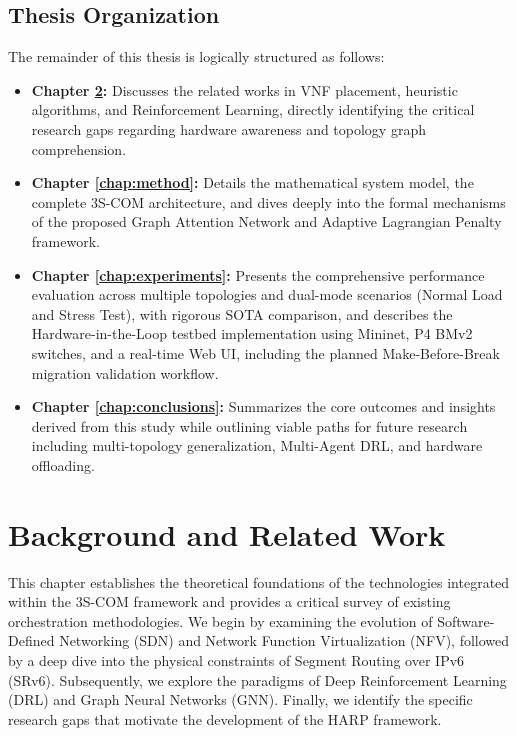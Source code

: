 \documentclass[12pt, a4paper, reqno, oneside]{book}
\begin{document}
\section{Thesis Organization}
The remainder of this thesis is logically structured as follows:
\begin{itemize}
    \item \textbf{Chapter \ref{chap:background_related}:} Discusses the related works in VNF placement, heuristic algorithms, and Reinforcement Learning, directly identifying the critical research gaps regarding hardware awareness and topology graph comprehension.
    \item \textbf{Chapter \ref{chap:method}:} Details the mathematical system model, the complete 3S-COM architecture, and dives deeply into the formal mechanisms of the proposed Graph Attention Network and Adaptive Lagrangian Penalty framework.
    \item \textbf{Chapter \ref{chap:experiments}:} Presents the comprehensive performance evaluation across multiple topologies and dual-mode scenarios (Normal Load and Stress Test), with rigorous SOTA comparison, and describes the Hardware-in-the-Loop testbed implementation using Mininet, P4 BMv2 switches, and a real-time Web UI, including the planned Make-Before-Break migration validation workflow.
    \item \textbf{Chapter \ref{chap:conclusions}:} Summarizes the core outcomes and insights derived from this study while outlining viable paths for future research including multi-topology generalization, Multi-Agent DRL, and hardware offloading.
\end{itemize}

\chapter{Background and Related Work}
\label{chap:background_related}

This chapter establishes the theoretical foundations of the technologies integrated within the 3S-COM framework and provides a critical survey of existing orchestration methodologies. We begin by examining the evolution of Software-Defined Networking (SDN) and Network Function Virtualization (NFV), followed by a deep dive into the physical constraints of Segment Routing over IPv6 (SRv6). Subsequently, we explore the paradigms of Deep Reinforcement Learning (DRL) and Graph Neural Networks (GNN). Finally, we identify the specific research gaps that motivate the development of the HARP framework.
\end{document}
